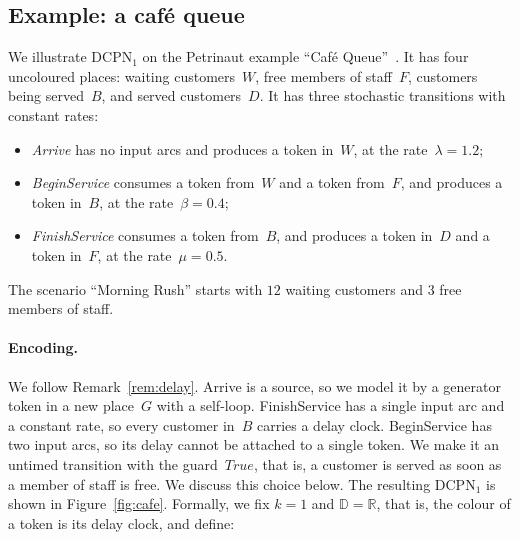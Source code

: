 \documentclass[11pt]{article}
\theoremstyle{definition}
\newcommand{\Real}{\mathbb{R}}
\newcommand{\Dom}{\mathbb{D}}
\newcommand{\DCPN}[1]{\texorpdfstring{\textup{DCPN}\ensuremath{_{#1}}}{DCPN#1}}
\begin{document}
\subsection{Example: a café queue}\label{sec:cafe}

We illustrate \DCPN{1} on the Petrinaut example ``Café
Queue''~\cite{Petrinaut}. It has four uncoloured places: waiting
customers~$W$, free members of staff~$F$, customers being served~$B$, and
served customers~$D$. It has three stochastic transitions with constant
rates:

\begin{itemize}
  \item \emph{Arrive} has no input arcs and produces a token in~$W$, at the
    rate~$\lambda = 1.2$;
  \item \emph{BeginService} consumes a token from~$W$ and a token from~$F$,
    and produces a token in~$B$, at the rate~$\beta = 0.4$;
  \item \emph{FinishService} consumes a token from~$B$, and produces a token
    in~$D$ and a token in~$F$, at the rate~$\mu = 0.5$.
\end{itemize}

The scenario ``Morning Rush'' starts with $12$ waiting customers and $3$
free members of staff.

\paragraph{Encoding.}
We follow Remark~\ref{rem:delay}. Arrive is a source, so we model it by a
generator token in a new place~$G$ with a self-loop. FinishService has a
single input arc and a constant rate, so every customer in~$B$ carries a
delay clock. BeginService has two input arcs, so its delay cannot be
attached to a single token. We make it an untimed transition with the
guard~$\mathit{True}$, that is, a customer is served as soon as a member of
staff is free. We discuss this choice below. The resulting \DCPN{1} is shown
in Figure~\ref{fig:cafe}. Formally, we fix $k = 1$ and $\Dom = \Real$, that
is, the colour of a token is its delay clock, and define:
\end{document}
